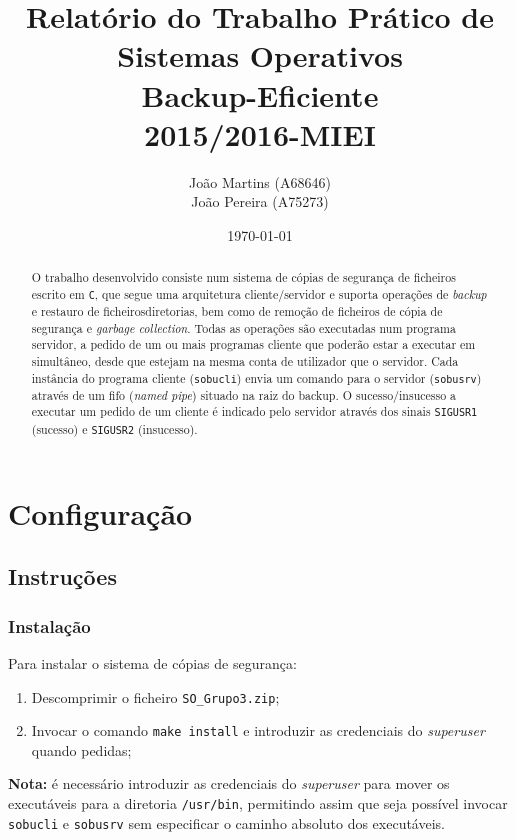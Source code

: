 \documentclass[a4paper,12pt,titlepage,portuguese]{article}
\title{Relatório do Trabalho Prático de Sistemas Operativos\\[1cm]\large{\textbf{Backup-Eficiente}}\\\large{2015/2016-MIEI}}
\author{João Martins (A68646) \\João Pereira (A75273)}
\date{\today}
\begin{document}
\maketitle

\begin{abstract}
O trabalho desenvolvido consiste num sistema de cópias de segurança de ficheiros escrito em \texttt{C}, que segue uma arquitetura cliente/servidor e suporta operações de \emph{backup} e restauro de ficheiros\/diretorias, bem como de remoção de ficheiros de cópia de segurança e \emph{garbage collection}. Todas as operações são executadas num programa servidor, a pedido de um ou mais programas cliente que poderão estar a executar em simultâneo, desde que estejam na mesma conta de utilizador que o servidor. Cada instância do programa cliente (\texttt{sobucli}) envia um comando para o servidor (\texttt{sobusrv}) através de um fifo (\emph{named pipe}) situado na raiz do backup. O sucesso/insucesso a executar um pedido de um cliente é indicado pelo servidor através dos sinais \texttt{SIGUSR1} (sucesso) e \texttt{SIGUSR2} (insucesso).

\end{abstract}

\tableofcontents

\newpage


\section{Configuração}

\subsection{Instruções}

\subsubsection{Instalação}

Para instalar o sistema de cópias de segurança:
	\begin{enumerate}
		\item Descomprimir o ficheiro \texttt{SO\_Grupo3.zip};
		\item Invocar o comando \texttt{make install} e introduzir as credenciais do \emph{superuser} quando pedidas;
	\end{enumerate}
\textbf{Nota:} é necessário introduzir as credenciais do \emph{superuser} para mover os executáveis para a diretoria \texttt{/usr/bin}, permitindo assim que seja possível invocar \texttt{sobucli} e \texttt{sobusrv} sem especificar o caminho absoluto dos executáveis.
\end{document}
